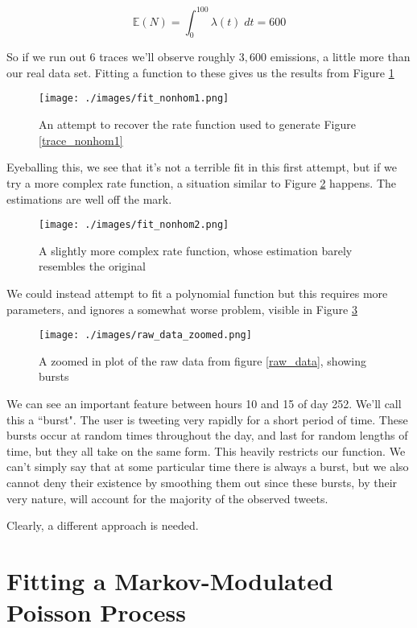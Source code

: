 $$
\mathbb{E}(N) = \int^{100}_0 \lambda(t) \; dt = 600
$$

So if we run out 6 traces we'll observe roughly $3,600$ emissions, a little more than our real data set. Fitting a function to these gives us the results from Figure \ref{fit_nonhom1}

\begin{figure}[h]
\texttt{[image: ./images/fit\_nonhom1.png]}
\caption{An attempt to recover the rate function used to generate Figure \ref{trace_nonhom1}}
\label{fit_nonhom1}
\end{figure}

Eyeballing this, we see that it's not a terrible fit in this first attempt, but if we try a more complex rate function, a situation similar to Figure \ref{fit_nonhom2} happens. The estimations are well off the mark.

\begin{figure}[h]
\texttt{[image: ./images/fit\_nonhom2.png]}
\caption{A slightly more complex rate function, whose estimation barely resembles the original}
\label{fit_nonhom2}
\end{figure}

We could instead attempt to fit a polynomial function but this requires more parameters, and ignores a somewhat worse problem, visible in Figure \ref{raw_data_zoomed}

\begin{figure}[h]
\texttt{[image: ./images/raw\_data\_zoomed.png]}
\caption{A zoomed in plot of the raw data from figure \ref{raw_data}, showing bursts}
\label{raw_data_zoomed}
\end{figure}

We can see an important feature between hours 10 and 15 of day 252. We'll call this a ``burst". The user is tweeting very rapidly for a short period of time. These bursts occur at random times throughout the day, and last for random lengths of time, but they all take on the same form. This heavily restricts our function. We can't simply say that at some particular time there is always a burst, but we also cannot deny their existence by smoothing them out since these bursts, by their very nature, will account for the majority of the observed tweets.

Clearly, a different approach is needed.

\section{Fitting a Markov-Modulated Poisson Process}

